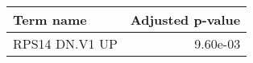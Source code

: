 \begin{tabular}{lr}
\toprule
     Term name &  Adjusted p-value \\
\midrule
RPS14 DN.V1 UP &          9.60e-03 \\
\bottomrule
\end{tabular}
